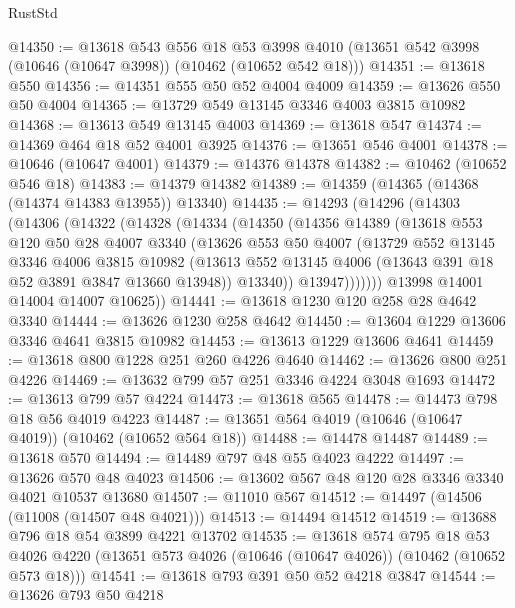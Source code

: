 \begin{lexlean}{RustStd}
\begin{coremodule}
@14350 := @13618
    @543
    @556
    @18
    @53
    @3998
    @4010
    (@13651 @542 @3998 (@10646 (@10647 @3998)) (@10462 (@10652 @542 @18)))
@14351 := @13618 @550
@14356 := @14351 @555 @50 @52 @4004 @4009
@14359 := @13626 @550 @50 @4004
@14365 := @13729 @549 @13145 @3346 @4003 @3815 @10982
@14368 := @13613 @549 @13145 @4003
@14369 := @13618 @547
@14374 := @14369 @464 @18 @52 @4001 @3925
@14376 := @13651 @546 @4001
@14378 := @10646 (@10647 @4001)
@14379 := @14376 @14378
@14382 := @10462 (@10652 @546 @18)
@14383 := @14379 @14382
@14389 := @14359 (@14365 (@14368 (@14374 @14383 @13955)) @13340)
@14435 := @14293
    (@14296
      (@14303
        (@14306
          (@14322
            (@14328
              (@14334
                (@14350
                  (@14356
                    @14389
                    (@13618
                      @553
                      @120
                      @50
                      @28
                      @4007
                      @3340
                      (@13626
                        @553
                        @50
                        @4007
                        (@13729
                          @552
                          @13145
                          @3346
                          @4006
                          @3815
                          @10982
                          (@13613 @552 @13145 @4006 (@13643 @391 @18 @52 @3891 @3847 @13660 @13948))
                          @13340))
                      @13947)))))))
        @13998
        @14001
        @14004
        @14007
        @10625))
@14441 := @13618 @1230 @120 @258 @28 @4642 @3340
@14444 := @13626 @1230 @258 @4642
@14450 := @13604 @1229 @13606 @3346 @4641 @3815 @10982
@14453 := @13613 @1229 @13606 @4641
@14459 := @13618 @800 @1228 @251 @260 @4226 @4640
@14462 := @13626 @800 @251 @4226
@14469 := @13632 @799 @57 @251 @3346 @4224 @3048 @1693
@14472 := @13613 @799 @57 @4224
@14473 := @13618 @565
@14478 := @14473 @798 @18 @56 @4019 @4223
@14487 := @13651 @564 @4019 (@10646 (@10647 @4019)) (@10462 (@10652 @564 @18))
@14488 := @14478 @14487
@14489 := @13618 @570
@14494 := @14489 @797 @48 @55 @4023 @4222
@14497 := @13626 @570 @48 @4023
@14506 := @13602 @567 @48 @120 @28 @3346 @3340 @4021 @10537 @13680
@14507 := @11010 @567
@14512 := @14497 (@14506 (@11008 (@14507 @48 @4021)))
@14513 := @14494 @14512
@14519 := @13688 @796 @18 @54 @3899 @4221 @13702
@14535 := @13618
    @574
    @795
    @18
    @53
    @4026
    @4220
    (@13651 @573 @4026 (@10646 (@10647 @4026)) (@10462 (@10652 @573 @18)))
@14541 := @13618 @793 @391 @50 @52 @4218 @3847
@14544 := @13626 @793 @50 @4218

\end{coremodule}
\end{lexlean}

